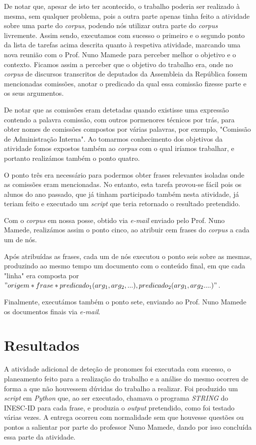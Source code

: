 \documentclass[a4paper,12pt,journal,twoside,compsoc]{PPIEEEtran}
\begin{document}
De notar que, apesar de isto ter acontecido, o trabalho poderia ser realizado à mesma, sem qualquer problema, pois a outra parte apenas tinha feito a atividade sobre uma parte do \textit{corpus}, podendo nós utilizar outra parte do \textit{corpus} livremente. Assim sendo, executamos com sucesso o primeiro e o segundo ponto da lista de tarefas acima descrita quanto à respetiva atividade, marcando uma nova reunião com o Prof. Nuno Mamede para perceber melhor o objetivo e o contexto. Ficamos assim a perceber que o objetivo do trabalho era, onde no \textit{corpus} de discursos transcritos de deputados da Assembleia da República fossem mencionadas comissões, anotar o predicado da qual essa comissão fizesse parte e os seus argumentos.

De notar que as comissões eram detetadas quando existisse uma expressão contendo a palavra comissão, com outros pormenores técnicos por trás, para obter nomes de comissões compostos por várias palavras, por exemplo, "Comissão de Administração Interna". Ao tomarmos conhecimento dos objetivos da atividade fomos expostos também ao \textit{corpus} com o qual iríamos trabalhar, e portanto realizámos também o ponto quatro.

O ponto três era necessário para podermos obter frases relevantes isoladas onde as comissões eram mencionadas. No entanto, esta tarefa provou-se fácil pois os alunos do ano passado, que já tinham participado também nesta atividade, já teriam feito e executado um \textit{script} que teria retornado o resultado pretendido.

Com o \textit{corpus} em nossa posse, obtido via \textit{e-mail} enviado pelo Prof. Nuno Mamede, realizámos assim o ponto cinco, ao atribuir cem frases do \textit{corpus} a cada um de nós. 

Após atribuídas as frases, cada um de nós executou o ponto seis sobre as mesmas, produzindo ao mesmo tempo um documento com o conteúdo final, em que cada "linha" era composta por $"origem * frase * predicado_1 (arg_1, arg_2, ...), predicado_2 (arg_1, arg_2. ...)"$. 

Finalmente, executámos também o ponto sete, enviando ao Prof. Nuno Mamede os documentos finais via \textit{e-mail}.

\section{Resultados}
\label{results}

A atividade adicional de deteção de pronomes foi executada com sucesso, o planeamento feito para a realização do trabalho e a análise do mesmo ocorreu de forma a que não houvessem dúvidas do trabalho a realizar. Foi produzido um \textit{script} em \textit{Python} que, ao ser executado, chamava o programa \textit{STRING} do INESC-ID para cada frase, e produzia o \textit{output} pretendido, como foi testado várias vezes.
A entrega ocorreu com normalidade sem que houvesse questões ou pontos a salientar por parte do professor Nuno Mamede, dando por isso concluída essa parte da atividade.
\end{document}
